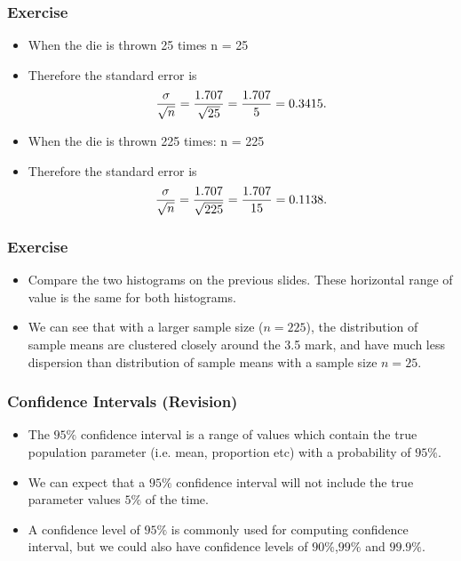\documentclass[a4]{beamer}
\begin{document}
\begin{frame}
\frametitle{Exercise}
\begin{itemize}
\item When the die is thrown 25 times n = 25
\item Therefore the standard error is
\[ {\sigma \over \sqrt{n}}  = {1.707 \over \sqrt{25}} = {1.707 \over 5} = 0.3415. \]
\item When the die is thrown 225 times: n = 225
\item Therefore the standard error is
\[ {\sigma \over \sqrt{n}}  = {1.707 \over \sqrt{225}} = {1.707 \over 15} = 0.1138. \]

\end{itemize}
\end{frame}


\begin{frame}
\frametitle{Exercise}
\begin{itemize}
\item Compare the two histograms on the previous slides. These horizontal range of value is the same for both histograms.

\item We can see that with a larger sample size ($n=225$), the distribution of sample means are clustered closely around the 3.5 mark, and have much less dispersion than distribution of sample means with a sample size $n=25$.

\end{itemize}
\end{frame}
\begin{frame}
\frametitle{Confidence Intervals (Revision) }

\begin{itemize}
\item The $95\%$ confidence interval is a range of values which contain the true population parameter (i.e. mean, proportion etc) with a probability of $95\%$.
\item We can expect that a $95\%$ confidence interval will not include the true parameter values $5\%$ of the time.
\item A confidence level of $95\%$ is commonly used for computing confidence interval, but we could also have confidence levels of $90\%$,$99\%$ and $99.9\%$.
\end{itemize}

\end{frame}
\end{document}

